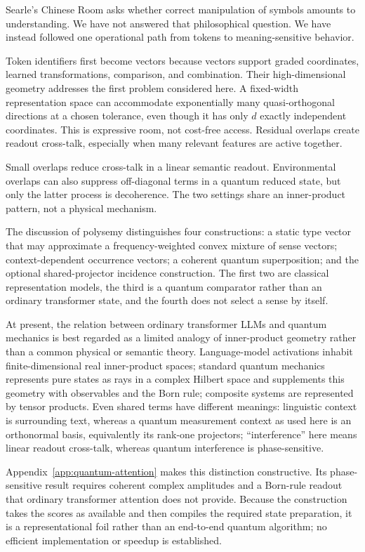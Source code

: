 \documentclass[
  aps,
  reprint,
  superscriptaddress,
  floatfix,
  nofootinbib,
  longbibliography
]{revtex4-2}
\begin{document}
Searle's Chinese Room asks whether correct manipulation of symbols amounts to
understanding.  We have not answered that philosophical question.  We have
instead followed one operational path from tokens to meaning-sensitive
behavior.

Token identifiers first become vectors because vectors support graded
coordinates, learned transformations, comparison, and combination.  Their
high-dimensional geometry addresses the first problem considered here.  A
fixed-width representation space can accommodate exponentially many
quasi-orthogonal
directions at a chosen tolerance, even though it has only $d$ exactly
independent coordinates.  This is expressive room, not cost-free access.
Residual overlaps create readout cross-talk, especially when many relevant
features are active together.

Small overlaps reduce cross-talk in a linear semantic readout.  Environmental
overlaps can also suppress off-diagonal terms in a quantum reduced state, but
only the latter process is decoherence.  The two settings share an
inner-product pattern, not a physical mechanism.

The discussion of polysemy distinguishes four constructions: a static type
vector that may approximate a frequency-weighted convex mixture of sense
vectors; context-dependent occurrence vectors; a coherent quantum
superposition; and the optional shared-projector incidence construction.  The
first two are classical representation models, the third is a quantum
comparator rather than an ordinary transformer state, and the fourth does not
select a sense by itself.

At present, the relation between ordinary transformer LLMs and quantum mechanics
is best regarded as a limited analogy of inner-product geometry rather than a
common physical or semantic theory.  Language-model activations inhabit
finite-dimensional real inner-product spaces; standard quantum mechanics
represents pure states as rays in a complex Hilbert space and supplements this
geometry with observables and the Born rule; composite systems are represented
by tensor products.  Even shared terms have different
meanings: linguistic context is surrounding text, whereas a quantum
measurement context as used here is an orthonormal basis, equivalently its
rank-one projectors; ``interference''
here means linear readout cross-talk, whereas quantum interference is
phase-sensitive.

Appendix~\ref{app:quantum-attention} makes this distinction constructive.  Its
phase-sensitive result requires coherent complex amplitudes and a Born-rule
readout that ordinary transformer attention does not provide.  Because the
construction takes the scores as available and then compiles the required
state preparation, it is a representational foil rather than an end-to-end
quantum algorithm; no efficient implementation or speedup is established.
\end{document}
